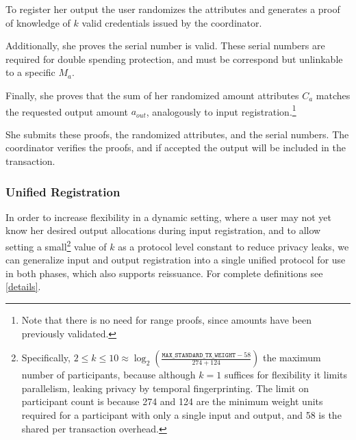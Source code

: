 \documentclass{article}
\begin{document}
To register her output the user randomizes the attributes and generates a proof of knowledge of $k$ valid credentials issued by the coordinator.

Additionally, she proves the serial number is valid. These serial numbers are required for double spending protection, and must be correspond but unlinkable to a specific $M_a$.

Finally, she proves that the sum of her randomized amount attributes $C_a$ matches the requested output amount $a_{\mathit{out}}$, analogously to input registration.\footnote{Note that there is no need for range proofs, since amounts have been previously validated.}

She submits these proofs, the randomized attributes, and the serial numbers. The coordinator verifies the proofs, and if accepted the output will be included in the transaction.

\subsubsection{Unified Registration}\label{unified}

In order to increase flexibility in a dynamic setting, where a user may not yet know her desired output allocations during input registration, and to allow setting a small\footnote{Specifically, $2 \le k \le 10 \approx \log_2\left(\frac{\mathtt{MAX\_STANDARD\_TX\_WEIGHT} - 58}{274 + 124}\right)$ the maximum number of participants, because although $k=1$ suffices for flexibility it limits parallelism, leaking privacy by temporal fingerprinting. The limit on participant count is because 274 and 124 are the minimum weight units required for a participant with only a single input and output, and 58 is the shared per transaction overhead.} value of $k$ as a protocol level constant to reduce privacy leaks, we can generalize input and output registration into a single unified protocol for use in both phases, which also supports reissuance. For complete definitions see \cref{details}.
\end{document}
